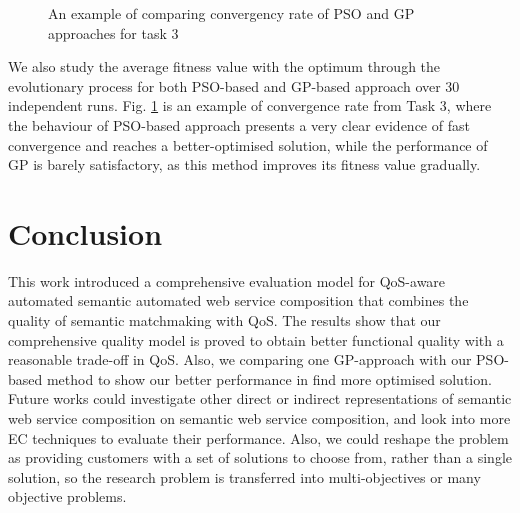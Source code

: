 \documentclass{IEEEtran}
\begin{document}
\begin{figure}[h]
\centering
{}
 \caption{An example of comparing convergency rate of PSO and GP approaches for task 3}
 \label{psovsgp}
\end{figure}

We also study the average fitness value with the optimum through the evolutionary process for both PSO-based and GP-based approach over 30 independent runs. Fig. \ref{psovsgp} is an example of convergence rate from Task 3, where the behaviour of PSO-based approach presents a very clear evidence of fast convergence and reaches a better-optimised solution, while the performance of GP is barely satisfactory, as this method improves its fitness value gradually.

\section{Conclusion}\label{conclusion}
This work introduced a comprehensive evaluation model for QoS-aware automated semantic automated web service composition that combines the quality of semantic matchmaking with QoS. The results show that our comprehensive quality model is proved to obtain better functional quality with a reasonable trade-off in QoS. Also, we comparing one GP-approach with our PSO-based method to show our better performance in find more optimised solution. Future works could investigate other direct or indirect representations of semantic web service composition on semantic web service composition, and look into more EC techniques to evaluate their performance. Also, we could reshape the problem as providing customers with a set of solutions to choose from, rather than a single solution, so the research problem is transferred into multi-objectives or many objective problems. 


\end{document}
